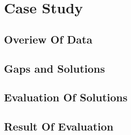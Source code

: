 
\section{Case Study}

\subsection{Overiew Of Data}

\subsection{Gaps and Solutions}

\subsection{Evaluation Of Solutions}

\subsection{Result Of Evaluation}

